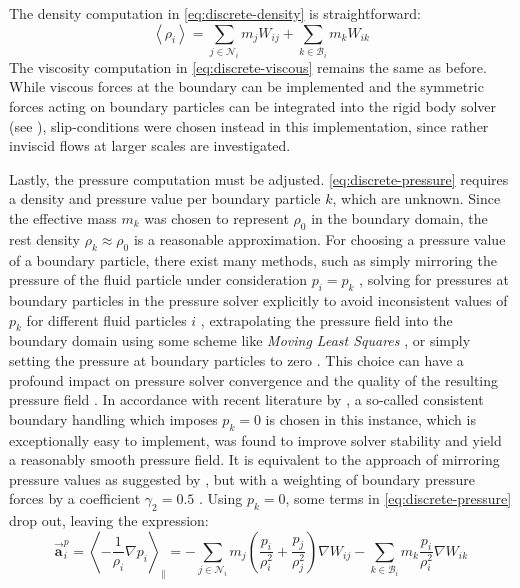 \documentclass[oneside, a4paper]{book}
\newcommand\angled[1]{\left\langle#1\right\rangle}
\newcommand\vek[1]{\vec{\bm{#1}}}
\newcommand\br[1]{\left(#1\right)}
\begin{document}
    The density computation in \autoref{eq:discrete-density} is straightforward:
    \begin{equation}\label{eq:discrete-density-boundary}
      \angled{\rho_i} = \sum_{j\in\mathcal{N}_i} m_j W_{ij} + \sum_{k\in\mathcal{B}_i} m_k W_{ik}
    \end{equation}
    The viscosity computation in \autoref{eq:discrete-viscous} remains the same as before. While viscous forces at the boundary can be implemented and the symmetric forces acting on boundary particles can be integrated into the rigid body solver (see \autocite[Akinci et al.]{versatile-boundary-akinci}), slip-conditions were chosen instead in this implementation, since rather inviscid flows at larger scales are investigated.

    Lastly, the pressure computation must be adjusted. \autoref{eq:discrete-pressure} requires a density and pressure value per boundary particle $k$, which are unknown. Since the effective mass $m_k$ was chosen to represent $\rho_0$ in the boundary domain, the rest density $\rho_k\approx\rho_0$ is a reasonable approximation. For choosing a pressure value of a boundary particle, there exist many methods, such as simply mirroring the pressure of the fluid particle under consideration $p_i=p_k$ \autocite{versatile-boundary-akinci}, solving for pressures at boundary particles in the pressure solver explicitly to avoid inconsistent values of $p_k$ for different fluid particles $i$ \autocite{pressure-boundaries}{}, extrapolating the pressure field into the boundary domain using some scheme like \textit{Moving Least Squares} \autocite{mls-pressure-extrapolation}, or simply setting the pressure at boundary particles to zero \autocite{consistent-boundaries}. This choice can have a profound impact on pressure solver convergence and the quality of the resulting pressure field \autocite{consistent-boundaries}. In accordance with recent literature by \autocite[Bender et al.]{consistent-boundaries}, a so-called consistent boundary handling which imposes $p_k=0$ is chosen in this instance, which is exceptionally easy to implement, was found to improve solver stability and yield a reasonably smooth pressure field. It is equivalent to the approach of mirroring pressure values as suggested by \autocite[Akinci et al.]{versatile-boundary-akinci}, but with a weighting of boundary pressure forces by a coefficient $\gamma_2=0.5$ \autocite{tutorial2019}. Using $p_k=0$, some terms in \autoref{eq:discrete-pressure} drop out, leaving the expression:
    \begin{equation}\label{eq:discrete-pressure-bdy}
      \vek{a}_i^p = \angled{-\frac{1}{\rho_i}\nabla p_i}_\parallel 
      = -\sum_{j\in\mathcal{N}_i} m_j \br{\frac{p_i}{\rho_i^2} + \frac{p_j}{\rho_j^2}} \nabla W_{ij} -\sum_{k\in\mathcal{B}_i} m_k\frac{p_i}{\rho_i^2} \nabla W_{ik}
    \end{equation}
\end{document}
